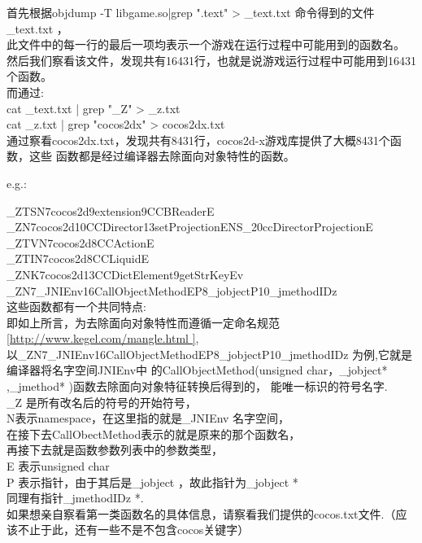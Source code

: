 首先根据objdump -T libgame.so|grep ".text" > \_text.txt 命令得到的文件\_text.txt ，\\
此文件中的每一行的最后一项均表示一个游戏在运行过程中可能用到的函数名。\\
然后我们察看该文件，发现共有16431行，也就是说游戏运行过程中可能用到16431个函数。\\
而通过:\\
cat \_text.txt | grep  "\_Z" > \_z.txt\\
cat \_z.txt | grep "cocos2dx" > cocos2dx.txt\\
通过察看cocos2dx.txt，发现共有8431行，cocos2d-x游戏库提供了大概8431个函数，这些
函数都是经过编译器去除面向对象特性的函数。
 
e.g.:

      \_ZTSN7cocos2d9extension9CCBReaderE\\
      \_ZN7cocos2d10CCDirector13setProjectionENS\_20ccDirectorProjectionE\\
      \_ZTVN7cocos2d8CCActionE\\
      \_ZTIN7cocos2d8CCLiquidE\\
      \_ZNK7cocos2d13CCDictElement9getStrKeyEv\\
      \_ZN7\_JNIEnv16CallObjectMethodEP8\_jobjectP10\_jmethodIDz\\
这些函数都有一个共同特点:\\
即如上所言，为去除面向对象特性而遵循一定命名规范\ref{http://www.kegel.com/mangle.html },\\
以\_ZN7\_JNIEnv16CallObjectMethodEP8\_jobjectP10\_jmethodIDz 为例,它就是编译器将名字空间JNIEnv中
的CallObjectMethod(unsigned char，\_jobject* ,\_jmethod* )函数去除面向对象特征转换后得到的，
能唯一标识的符号名字.\\
\_Z 是所有改名后的符号的开始符号，\\
N表示namespace，在这里指的就是\_JNIEnv 名字空间，\\
在接下去CallObectMethod表示的就是原来的那个函数名，\\
再接下去就是函数参数列表中的参数类型，\\
E 表示unsigned char\\
P 表示指针，由于其后是\_jobject ，故此指针为\_jobject *\\
同理有指针\_jmethodIDz *.\\
	
如果想亲自察看第一类函数名的具体信息，请察看我们提供的cocos.txt文件.（应该不止于此，还有一些不是不包含cocos关键字）\\

